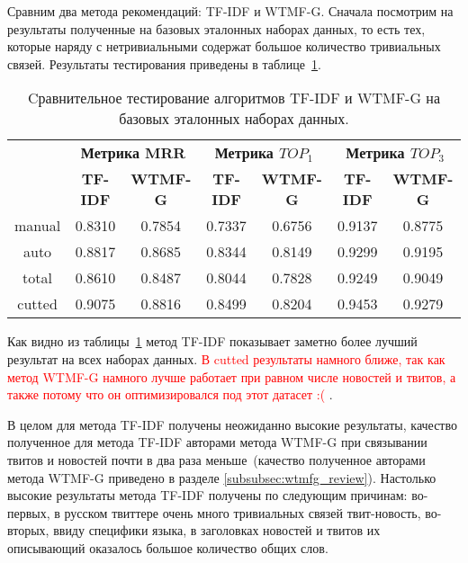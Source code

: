    Сравним два метода рекомендаций: TF-IDF и WTMF-G. Сначала посмотрим на результаты полученные на 
    базовых эталонных наборах данных, то есть тех, которые наряду с нетривиальными содержат большое количество тривиальных связей.
    Результаты тестирования приведены в таблице~\ref{tabular:tfidf_wmtfg}.

    \begin{table}[ht!]
    \caption{Cравнительное тестирование алгоритмов TF-IDF и WTMF-G на базовых эталонных наборах данных. \bigskip}
    \centering

    \label{tabular:tfidf_wmtfg}
        \begin{tabular}{|c|c|c|c|c|c|c|}
            \hline
            \bf{\multirow{2}{*}{\specialcell{Набор данных}}} &
            \multicolumn{2}{|c|}{\bf{Метрика MRR}} &
            \multicolumn{2}{|c|}{\bf{Метрика $TOP_1$}} &
            \multicolumn{2}{|c|}{\bf{Метрика $TOP_3$}} \\ \cline{2-7}
            & \bf{TF-IDF} & \bf{WTMF-G} & \bf{TF-IDF} & \bf{WTMF-G} & \bf{TF-IDF} & \bf{WTMF-G} \\ \hline
            manual & 0.8310 & 0.7854 & 0.7337 & 0.6756 & 0.9137 & 0.8775 \\ \hline
            auto   & 0.8817 & 0.8685 & 0.8344 & 0.8149 & 0.9299 & 0.9195 \\ \hline
            total  & 0.8610 & 0.8487 & 0.8044 & 0.7828 & 0.9249 & 0.9049\\ \hline
            cutted & 0.9075 & 0.8816 & 0.8499 & 0.8204 & 0.9453 & 0.9279 \\ \hline
        \end{tabular}
    \end{table}

    Как видно из таблицы~\ref{tabular:tfidf_wmtfg} метод TF-IDF показывает заметно более лучший результат на всех наборах данных.
    \textcolor{red}{В cutted  результаты намного ближе, так как метод WTMF-G намного лучше работает при равном числе новостей и твитов, а также потому что он оптимизировался под этот датасет :( }.

    В целом для метода TF-IDF получены неожиданно высокие результаты, качество полученное для метода TF-IDF авторами метода WTMF-G при связывании твитов и новостей почти в два раза меньше~(качество полученное авторами метода WTMF-G приведено в разделе \ref{subsubsec:wtmfg_review}).
    Настолько высокие результаты метода TF-IDF получены по следующим причинам: во-первых, в русском твиттере очень много тривиальных связей твит-новость, во-вторых, ввиду специфики языка, в заголовках новостей и твитов их описывающий оказалось большое количество общих слов.

